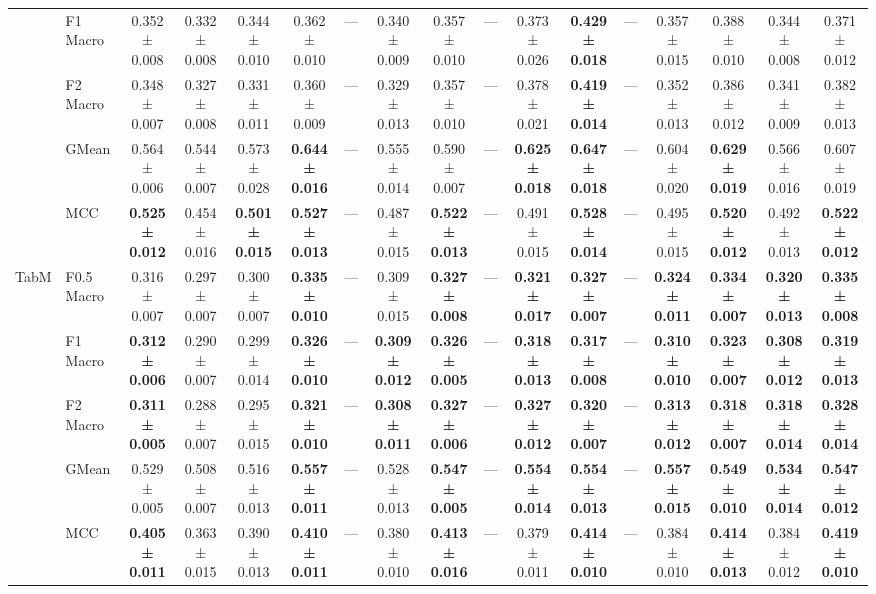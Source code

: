 \begin{table}[H]
{\begin{tabular}{llccccccccccccccc}
 & F1 Macro & 0.352 ± 0.008 & 0.332 ± 0.008 & 0.344 ± 0.010 & 0.362 ± 0.010 & — & 0.340 ± 0.009 & 0.357 ± 0.010 & — & 0.373 ± 0.026 & \textbf{0.429 ± 0.018} & — & 0.357 ± 0.015 & 0.388 ± 0.010 & 0.344 ± 0.008 & 0.371 ± 0.012 \\
 & F2 Macro & 0.348 ± 0.007 & 0.327 ± 0.008 & 0.331 ± 0.011 & 0.360 ± 0.009 & — & 0.329 ± 0.013 & 0.357 ± 0.010 & — & 0.378 ± 0.021 & \textbf{0.419 ± 0.014} & — & 0.352 ± 0.013 & 0.386 ± 0.012 & 0.341 ± 0.009 & 0.382 ± 0.013 \\
 & GMean & 0.564 ± 0.006 & 0.544 ± 0.007 & 0.573 ± 0.028 & \textbf{0.644 ± 0.016} & — & 0.555 ± 0.014 & 0.590 ± 0.007 & — & \textbf{0.625 ± 0.018} & \textbf{0.647 ± 0.018} & — & 0.604 ± 0.020 & \textbf{0.629 ± 0.019} & 0.566 ± 0.016 & 0.607 ± 0.019 \\
 & MCC & \textbf{0.525 ± 0.012} & 0.454 ± 0.016 & \textbf{0.501 ± 0.015} & \textbf{0.527 ± 0.013} & — & 0.487 ± 0.015 & \textbf{0.522 ± 0.013} & — & 0.491 ± 0.015 & \textbf{0.528 ± 0.014} & — & 0.495 ± 0.015 & \textbf{0.520 ± 0.012} & 0.492 ± 0.013 & \textbf{0.522 ± 0.012} \\
\cline{1-17}
\multirow[t]{5}{*}{TabM} & F0.5 Macro & 0.316 ± 0.007 & 0.297 ± 0.007 & 0.300 ± 0.007 & \textbf{0.335 ± 0.010} & — & 0.309 ± 0.015 & \textbf{0.327 ± 0.008} & — & \textbf{0.321 ± 0.017} & \textbf{0.327 ± 0.007} & — & \textbf{0.324 ± 0.011} & \textbf{0.334 ± 0.007} & \textbf{0.320 ± 0.013} & \textbf{0.335 ± 0.008} \\
 & F1 Macro & \textbf{0.312 ± 0.006} & 0.290 ± 0.007 & 0.299 ± 0.014 & \textbf{0.326 ± 0.010} & — & \textbf{0.309 ± 0.012} & \textbf{0.326 ± 0.005} & — & \textbf{0.318 ± 0.013} & \textbf{0.317 ± 0.008} & — & \textbf{0.310 ± 0.010} & \textbf{0.323 ± 0.007} & \textbf{0.308 ± 0.012} & \textbf{0.319 ± 0.013} \\
 & F2 Macro & \textbf{0.311 ± 0.005} & 0.288 ± 0.007 & 0.295 ± 0.015 & \textbf{0.321 ± 0.010} & — & \textbf{0.308 ± 0.011} & \textbf{0.327 ± 0.006} & — & \textbf{0.327 ± 0.012} & \textbf{0.320 ± 0.007} & — & \textbf{0.313 ± 0.012} & \textbf{0.318 ± 0.007} & \textbf{0.318 ± 0.014} & \textbf{0.328 ± 0.014} \\
 & GMean & 0.529 ± 0.005 & 0.508 ± 0.007 & 0.516 ± 0.013 & \textbf{0.557 ± 0.011} & — & 0.528 ± 0.013 & \textbf{0.547 ± 0.005} & — & \textbf{0.554 ± 0.014} & \textbf{0.554 ± 0.013} & — & \textbf{0.557 ± 0.015} & \textbf{0.549 ± 0.010} & \textbf{0.534 ± 0.014} & \textbf{0.547 ± 0.012} \\
 & MCC & \textbf{0.405 ± 0.011} & 0.363 ± 0.015 & 0.390 ± 0.013 & \textbf{0.410 ± 0.011} & — & 0.380 ± 0.010 & \textbf{0.413 ± 0.016} & — & 0.379 ± 0.011 & \textbf{0.414 ± 0.010} & — & 0.384 ± 0.010 & \textbf{0.414 ± 0.013} & 0.384 ± 0.012 & \textbf{0.419 ± 0.010} \\

\end{tabular}}
\end{table}
